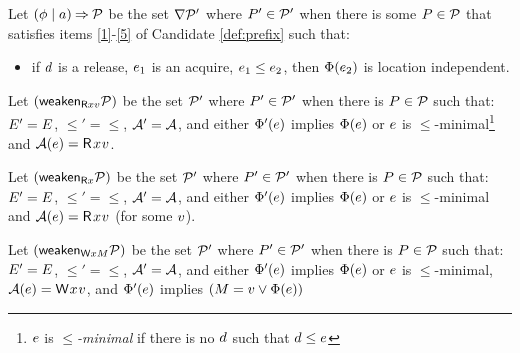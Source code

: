 \begin{definition}
  \label{def:cover}
  Let $(\phi \mid a) \mathbin\Rightarrow \mathcal{P}$ be the set $\nabla \mathcal{P}'$ %
  where $P'\in\mathcal{P}'$ when there is some $P\in\mathcal{P}$ that satisfies
  items \ref{1}-\ref{5} of Candidate \ref{def:prefix} such that:
  \begin{itemize}
  \item[{\labeltextsc[P6]{(P6)}{6}}]
    if $d$ is a release, $e_1$ is an acquire, $e_1\le e_2$, then $\Phi(e_2)$
    is location independent.
  \end{itemize}  
  
  Let $(\mathsf{weaken}_{\mathsf{R}xv}\mathcal{P})$ be the set $\mathcal{P}'$ where $P'\in\mathcal{P}'$
  when there is $P\in\mathcal{P}$ such that: $E' = E$,
  ${\le'} = {\le}$, $\mathcal{A}' = \mathcal{A}$, and either
  $\Phi'(e)$ implies $\Phi(e)$ or $e$ is
  $\le$-minimal\footnote{$e$ is \emph{$\le$-minimal} if there is no $d$
    such that $d\le e$} and
  $\labelingAct(\aEv)=\DR[\modeRLXquiet]{\aLoc}{\aVal}$.

  Let $(\mathsf{weaken}_{\mathsf{R}x}\mathcal{P})$ be the set $\mathcal{P}'$ where $P'\in\mathcal{P}'$
  when there is $P\in\mathcal{P}$ such that: $E' = E$, ${\le'} = {\le}$,
  $\mathcal{A}' = \mathcal{A}$,
  and either
  $\Phi'(e)$ implies $\Phi(e)$ or $e$ is
  $\le$-minimal and
  $\labelingAct(\aEv)=\DR[\modeRLXquiet]{\aLoc}{\aVal}$ (for some $v$).

  Let $(\mathsf{weaken}_{\mathsf{W}xM}\mathcal{P})$ be the set $\mathcal{P}'$ where $P'\in\mathcal{P}'$
  when there is $P\in\mathcal{P}$ such that: $E' = E$, ${\le'} = {\le}$,
  $\mathcal{A}' = \mathcal{A}$, 
  and either
  $\Phi'(e)$ implies $\Phi(e)$ or $e$ is
  $\le$-minimal,
  $\labelingAct(\aEv)=\DW[\modeRLXquiet]{\aLoc}{\aVal}$, and
  $\Phi'(e)$ implies $(M=v\lor\Phi(e))$
  

\end{definition}
